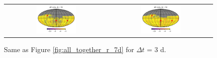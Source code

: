 \documentclass[preprintm,linenumbers]{aastex631}
\begin{document}
\begin{figure}
\begin{tabular}{c c}
         \includegraphics[width=0.4\textwidth]{results/skymaps_cutout/skymaps_cutout_delta_first_year_one_snap_v4_0_10yrs_db_noDD_noTwi_tscale-3_nside-256_doAllTemplateMetrics_reduceCount_g_noDD_noTwi.pdf} &
         \includegraphics[width=0.4\textwidth]{results/skymaps_cutout/skymaps_cutout_delta_first_year_one_snap_v4_0_10yrs_db_noDD_noTwi_tscale-3_nside-256_doAllTemplateMetrics_reduceCount_r_noDD_noTwi.pdf} \\

   \end{tabular}

        \caption{
        Same as Figure \ref{fig:all_together_r_7d} for $\Delta t$ = 3 d. 
        }
        \label{fig:all_together_r_3d}
	\end{figure}

  
\end{document}

